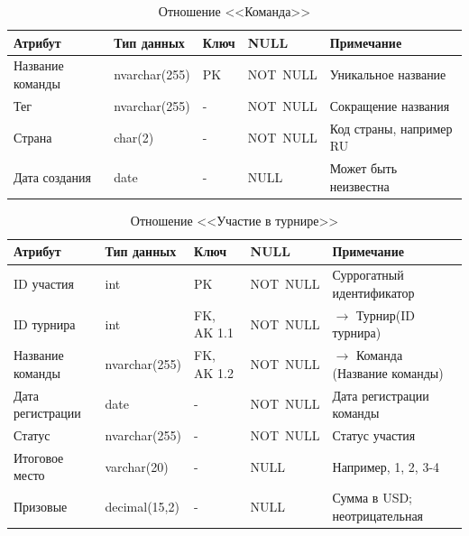 \documentclass[a4paper, 14pt]{extarticle}
\begin{document}
\begin{table}[H]
\caption{Отношение <<Команда>>}
\label{tab:team}
\centering
\fontsize{10.5}{12.6}\selectfont
\setlength{\tabcolsep}{4pt}
\renewcommand{\arraystretch}{1.12}
\begin{tabularx}{\textwidth}{|L{3.5cm}|L{2.3cm}|L{2.0cm}|L{1.9cm}|Y|}
\hline
\textbf{Атрибут} & \textbf{Тип данных} & \textbf{Ключ} & \textbf{NULL} & \textbf{Примечание} \\ \hline
Название команды & nvarchar(255) & PK & \mbox{NOT NULL} & Уникальное название \\ \hline
Тег & nvarchar(255) & - & \mbox{NOT NULL} & Сокращение названия \\ \hline
Страна & char(2) & - & \mbox{NOT NULL} & Код страны, например RU \\ \hline
Дата создания & date & - & \mbox{NULL} & Может быть неизвестна \\ \hline
\end{tabularx}
\end{table}

\begin{table}[H]
\caption{Отношение <<Участие в турнире>>}
\label{tab:part}
\centering
\fontsize{10.5}{12.6}\selectfont
\setlength{\tabcolsep}{4pt}
\renewcommand{\arraystretch}{1.12}
\begin{tabularx}{\textwidth}{|L{3.5cm}|L{2.3cm}|L{2.0cm}|L{1.9cm}|Y|}
\hline
\textbf{Атрибут} & \textbf{Тип данных} & \textbf{Ключ} & \textbf{NULL} & \textbf{Примечание} \\ \hline
ID участия & int & PK & \mbox{NOT NULL} & Суррогатный идентификатор \\ \hline
ID турнира & int & FK, AK 1.1 & \mbox{NOT NULL} & $\to$  Турнир(ID турнира) \\ \hline
Название команды & nvarchar(255) & FK, AK 1.2 & \mbox{NOT NULL} & $\to$  Команда (Название команды) \\ \hline
Дата регистрации & date & - & \mbox{NOT NULL} & Дата регистрации команды \\ \hline
Статус & nvarchar(255) & - & \mbox{NOT NULL} & Статус участия \\ \hline
Итоговое место & varchar(20) & - & \mbox{NULL} & Например, 1, 2, 3-4 \\ \hline
Призовые & decimal(15,2) & - & \mbox{NULL} & Сумма в USD; неотрицательная \\ \hline
\end{tabularx}
\end{table}

\clearpage
\end{document}
